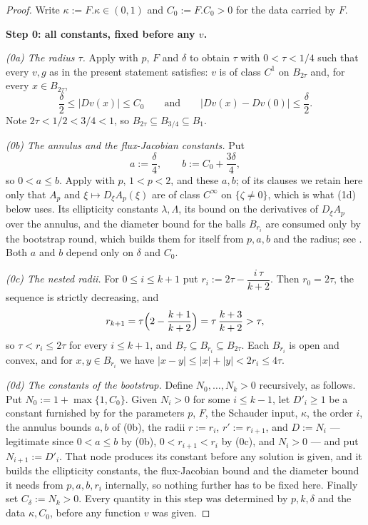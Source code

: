 \begin{proof}
Write $\kappa:=F.\kappa\in(0,1)$ and $C_0:=F.C_0>0$ for the data carried by $F$.

\medskip\noindent\textbf{Step 0: all constants, fixed before any $v$.}

\emph{(0a) The radius $\tau$.}  Apply  with $p$, $F$ and $\delta$ to
obtain $\tau$ with $0<\tau<1/4$ such that every $v,g$ as in the present statement satisfies: $v$
is of class $C^{1}$ on $B_{2\tau}$ and, for every $x\in B_{2\tau}$,
\begin{equation}\label{eq:nc-ann}
  \frac{\delta}{2}\le\lvert Dv(x)\rvert\le C_0
  \qquad\text{and}\qquad
  \lvert Dv(x)-Dv(0)\rvert\le\frac{\delta}{2}.
\end{equation}
Note $2\tau<1/2<3/4<1$, so $B_{2\tau}\subseteq B_{3/4}\subseteq B_1$.

\emph{(0b) The annulus and the flux-Jacobian constants.}  Put
\[
  a:=\frac{\delta}{4},\qquad b:=C_0+\frac{3\delta}{4},
\]
so $0<a\le b$.  Apply  with $p$, $1<p<2$, and these $a,b$; of its
clauses we retain here only that $A_p$ and $\xi\mapsto D_\xi A_p(\xi)$ are of class
$C^{\infty}$ on $\{\zeta\ne0\}$, which is what (1d) below uses.  Its ellipticity constants
$\lambda,\Lambda$, its bound on the derivatives of $D_\xi A_p$ over the annulus, and the
diameter bound for the balls $B_{r_i}$ are consumed only by the bootstrap round, which builds
them for itself from $p,a,b$ and the radius; see .  Both $a$
and $b$ depend only on $\delta$ and $C_0$.

\emph{(0c) The nested radii.}  For $0\le i\le k+1$ put
$r_i:=2\tau-\dfrac{i\,\tau}{k+2}$.  Then $r_0=2\tau$, the sequence is strictly decreasing, and
\[
  r_{k+1}=\tau\Bigl(2-\frac{k+1}{k+2}\Bigr)=\tau\,\frac{k+3}{k+2}>\tau,
\]
so $\tau<r_i\le2\tau$ for every $i\le k+1$, and $B_\tau\subseteq B_{r_i}\subseteq B_{2\tau}$.
Each $B_{r_i}$ is open and convex, and for $x,y\in B_{r_i}$ we have
$\lvert x-y\rvert\le\lvert x\rvert+\lvert y\rvert<2r_i\le4\tau$.

\emph{(0d) The constants of the bootstrap.}  Define $N_0,\ldots,N_k>0$ recursively, as follows.
Put $N_0:=1+\max\{1,C_0\}$.  Given $N_i>0$ for some $i\le k-1$, let $D'_i\ge1$ be a constant
furnished by  for the parameters $p$, $F$, the Schauder input,
$\kappa$, the order $i$, the annulus bounds $a,b$ of (0b), the radii $r:=r_i$, $r':=r_{i+1}$,
and $D:=N_i$ --- legitimate since $0<a\le b$ by (0b), $0<r_{i+1}<r_i$ by (0c), and $N_i>0$ ---
and put $N_{i+1}:=D'_i$.  That node produces its constant before any solution is given, and it
builds the ellipticity constants, the flux-Jacobian bound and the diameter bound it needs from
$p,a,b,r_i$ internally, so nothing further has to be fixed here.
Finally set $C_\delta:=N_k>0$.  Every quantity in this step was determined by $p,k,\delta$ and
the data $\kappa,C_0$, before any function $v$ was given.


\end{proof}

